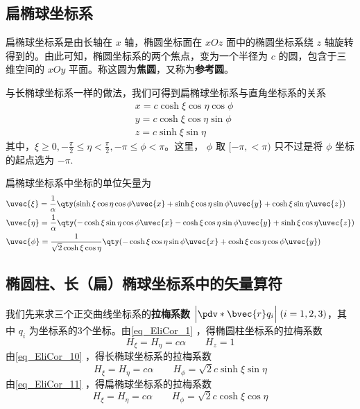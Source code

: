 \subsection{扁椭球坐标系}
扁椭球坐标系是由长轴在 $x$ 轴，椭圆坐标面在 $xOz$ 面中的椭圆坐标系绕 $z$ 轴旋转得到的。由此可知，椭圆坐标系的两个焦点，变为一个半径为 $c$ 的圆，包含于三维空间的 $xOy$ 平面。称这圆为\textbf{焦圆}，又称为\textbf{参考圆}。

与长椭球坐标系一样的做法，我们可得到扁椭球坐标系与直角坐标系的关系
\begin{equation}\label{eq_EliCor_11}
\begin{aligned}
&x=c\cosh\xi\cos\eta\cos\phi\\
&y=c\cosh\xi\cos\eta\sin\phi\\
&z=c\sinh\xi\sin\eta
\end{aligned}
\end{equation}
其中，$\xi\geq 0,-\frac{\pi}{2}\leq\eta<\frac{\pi}{2},-\pi\leq\phi<\pi$。这里， $\phi$ 取 $[-\pi,<\pi)$ 只不过是将 $\phi$ 坐标的起点选为 $-\pi$.

扁椭球坐标系中坐标的单位矢量为
\begin{equation}
\begin{aligned}
&\uvec{\xi}=\frac{1}{\alpha}\qty(\sinh\xi\cos\eta\cos\phi\uvec{x}+\sinh\xi\cos\eta\sin\phi\uvec{y}+\cosh\xi\sin\eta\uvec{z})\\
&\uvec{\eta}=\frac{1}{\alpha}\qty(-\cosh\xi\sin\eta\cos\phi\uvec{x}-\cosh\xi\cos\eta\sin\phi\uvec{y}+\sinh\xi\cos\eta\uvec{z})\\
&\uvec{\phi}=\frac{1}{\sqrt{2}\cosh\xi\cos\eta}\qty(-\cosh\xi\cos\eta\sin\phi\uvec{x}+\cosh\xi\cos\eta\cos\phi\uvec{y})
\end{aligned}
\end{equation}

\subsection{椭圆柱、长（扁）椭球坐标系中的矢量算符}
我们先来求三个正交曲线坐标系的\textbf{拉梅系数} $\Big|\pdv*{\bvec{r}}{q_i}\Big|\;(i=1,2,3)$，其中 $q_i$ 为坐标系的3个坐标。由\autoref{eq_EliCor_1} ，得椭圆柱坐标系的拉梅系数
\begin{equation}
H_\xi=H_\eta=c\alpha \quad \quad H_z=1
\end{equation}
由\autoref{eq_EliCor_10} ，得长椭球坐标系的拉梅系数
\begin{equation}
H_\xi=H_\eta=c\alpha \quad \quad H_\phi=\sqrt{2}c\sinh\xi\sin\eta
\end{equation}
由\autoref{eq_EliCor_11} ，得扁椭球坐标系的拉梅系数
\begin{equation}
H_\xi=H_\eta=c\alpha \quad \quad H_\phi=\sqrt{2}c\cosh\xi\cos\eta
\end{equation}
